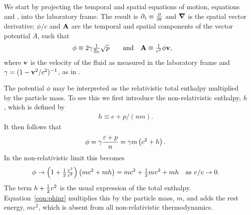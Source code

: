 We start  by projecting the temporal and spatial equations of motion, equations  and ,
into the laboratory frame.
The result is
$\operatorname{\partial}_t \equiv \frac{\partial }{\partial t}$ and $\mbox{\boldmath $\nabla$}$ is the spatial vector derivative;
$\phi / c$ and $\textbf{A}$ are the temporal and spatial components of the vector potential $A$, such that
\begin{align}
\phi &\equiv  2\gamma \tfrac{1}{\scalefactor }\sqrt {p}   %
& \quad\text{and} &&
\vA &\equiv \tfrac{1}{c^2} \phi \vv,  %
 \end{align}
where $\textbf{v}$ is the velocity  of the fluid as measured in the laboratory frame and 
 $\gamma = (1-\textbf{v}^2/c^2)^{-1}$, as in .

The potential $\phi$ may be  interpreted as the relativistic  total enthalpy multiplied by the particle mass.
To see this we first introduce the non-relativistic enthalpy, $h$, which is defined by
\begin{align}
  h \equiv e + p/(nm).
\end{align}
It then follows that 
\begin{align}
  \phi  =   \gamma\frac{\varepsilon + p }{n} = \gamma m\left( c^2 + h \right).
\end{align}
In the  non-relativistic limit this becomes
\begin{align}
  \phi \rightarrow \left( 1+\tfrac{1}{2}\tfrac{v^2}{c^2} \right) \left( mc^2 + mh \right) = mc^2 + \tfrac{1}{2}m v^2 + mh \text{\quad as ${v/c\rightarrow 0.}$}
  \label{eqn:phinr}
\end{align}
The term $h + \tfrac{1}{2} v^2$ is the usual expression of the total enthalpy.
Equation~\ref{eqn:phinr} multiplies this by the particle mass, $m$, and adds the rest energy, $mc^2$, 
which is absent from all non-relativistic thermodynamics.




